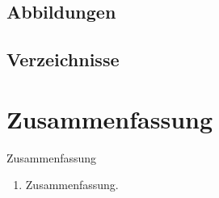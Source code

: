 \subsection{Abbildungen}


\subsection{Verzeichnisse}

\section*{Zusammenfassung}

\begin{frame}{Zusammenfassung}
  \begin{enumerate}
    \item Zusammenfassung.
  \end{enumerate}
\end{frame}